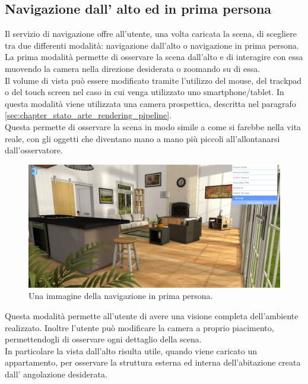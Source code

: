 \subsection{Navigazione dall' alto ed in prima persona}
Il servizio di navigazione offre all’utente, una volta caricata la scena, di scegliere tra due differenti modalità: navigazione dall’alto o navigazione in prima persona.
\\
La prima modalità permette di osservare la scena dall’alto e di interagire con essa muovendo la camera nella direzione desiderata o zoomando su di essa. 
\\
Il volume di vista può essere modificato tramite l’utilizzo del mouse, del trackpad o del touch screen nel caso in cui venga utilizzato uno smartphone/tablet.
In questa modalità viene utilizzata una camera prospettica, descritta nel paragrafo \ref{sec:chapter_stato_arte_rendering_pipeline}. 
\\
Questa permette di osservare la scena in modo simile a come si farebbe nella vita reale, con gli oggetti che diventano mano a mano più piccoli all’allontanarsi dall’osservatore.
\\
\begin{figure}[htb]
 \centering
 \includegraphics[width=1\linewidth]{images/chapter_navigazione_scena/navigator_persp.png}\hfill
 \caption[Navigazione in prima persona]{Una immagine della navigazione in prima persona.}
 \label{fig:navigazione_scena_navigator_persp}
\end{figure}
Questa modalità permette all’utente di avere una visione completa dell’ambiente realizzato. Inoltre l’utente può modificare la camera a proprio piacimento, permettendogli di osservare ogni dettaglio della scena.
\\
In particolare la vista dall’alto risulta utile, quando viene caricato un appartamento, per osservare la struttura esterna ed interna dell’abitazione creata dall’ angolazione desiderata.
